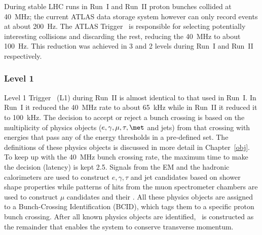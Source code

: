 \par During stable LHC runs in Run~I and Run~II proton bunches collided at \SI{40}{\mega\hertz}; 
the current ATLAS data storage system however can only record events at about \SI{200}{\hertz}.
The ATLAS Trigger~\cite{PERF-2011-02} is responsible for selecting potentially interesting collisions
 and discarding the rest, reducing the \SI{40}{\mega\hertz} to about \SI{100}{\hertz}.
This reduction was achieved in 3  and 2 levels during Run~I and Run~II respectively.

\subsubsection{Level 1 }
\par Level 1 Trigger~\cite{1742-6596-396-1-012010} (L1) during Run~II is almost 
identical to that used in Run~I. In Run~I it reduced the \SI{40}{\mega\hertz} rate to about \SI{65}{\kilo\hertz}
while in Run~II it reduced it to \SI{100}{\kilo\hertz}.
The decision to accept or reject a bunch crossing is based on the multiplicity 
of physics objects ($e,\gamma,\mu,\tau,\met$ and jets) from that crossing with energies that pass 
any of the energy thresholds in a pre-defined set. The definitions of these physics objects is discussed in more 
detail in Chapter~\ref{obj}. To keep up with the \SI{40}{\mega\hertz} bunch crossing rate,
the maximum time to make the decision (latency) is kept \SI{2.5}{\micron}.
Signals from the EM and the hadronic calorimeters are used 
to construct $e,\gamma,\tau$ and jet candidates based on shower shape properties 
while patterns of hits from the muon spectrometer chambers are used to construct $\mu$ candidates and their \pT.
All these physics objects are assigned to a Bunch-Crossing Identification (BCID),  
which tags them to a specific proton bunch crossing. After all known physics 
objects are identified, \met\ is constructed as the remainder that enables the system to conserve 
transverse momentum. 


